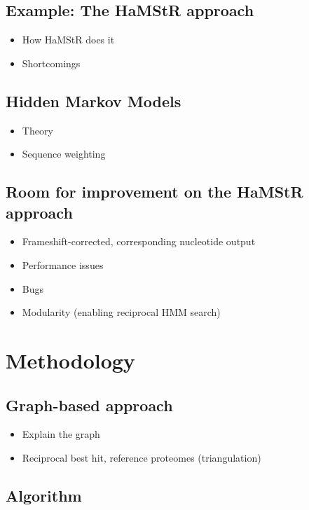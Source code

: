 \documentclass[a4paper]{scrartcl}
\begin{document}
\subsection{Example: The HaMStR approach}

\begin{itemize}
	\item How HaMStR does it
	\item Shortcomings
\end{itemize}

\subsection{Hidden Markov Models}

\begin{itemize}
	\item Theory
	\item Sequence weighting
\end{itemize}

\subsection{Room for improvement on the HaMStR approach}

\begin{itemize}
	\item Frameshift-corrected, corresponding nucleotide output
	\item Performance issues
	\item Bugs
	\item Modularity (enabling reciprocal HMM search)
\end{itemize}

\clearpage

\section{Methodology}

\subsection{Graph-based approach}

\begin{itemize}
	\item Explain the graph
	\item Reciprocal best hit, reference proteomes (triangulation)
\end{itemize}

\subsection{Algorithm}
\end{document}
